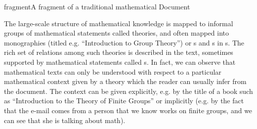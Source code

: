 \begin{myfig}{fragment}{A fragment of a traditional mathematical Document}
\end{myfig}

The large-scale structure of mathematical knowledge is mapped to informal groups
of mathematical statements called theories, and often mapped into
monographies (titled e.g. ``Introduction to Group Theory'') or
{s} and {s} in {s}. The
rich set of relations among such theories is described in the text, sometimes
supported by mathematical statements called {s}. In fact, we can observe that
mathematical texts can only be understood with respect to a particular
mathematical context given by a theory which the reader can usually infer from the
document. The context can be given explicitly, e.g. by the title of a book such as
``Introduction to the Theory of Finite Groups'' or implicitly (e.g. by the
fact that the e-mail comes from a person that we know works on finite groups, and
we can see that she is talking about math).
  
